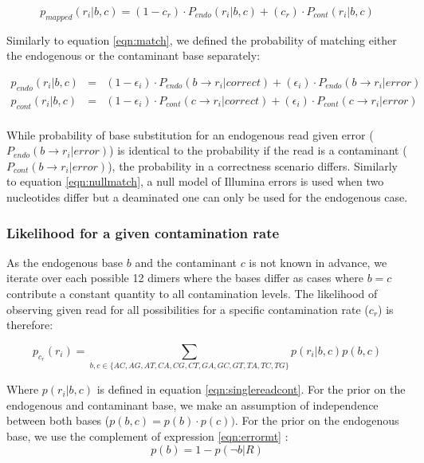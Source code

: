 \documentclass[a4paper,12pt]{article}
\begin{document}
\begin{equation}
p_{mapped}(r_i|b,c) = (1-c_r) \cdot P_{endo} (r_i|b,c)   + (c_r) \cdot P_{cont} (r_i|b,c)
\end{equation}

\noindent Similarly to equation \ref{eqn:match}, we defined the probability of matching either the endogenous or the contaminant base separately:


\begin{eqnarray}
  p_{endo}(r_i|b,c)   & = &  (1-\epsilon_i ) \cdot  P_{endo}( b \to r_i|correct) +  (\epsilon_i) \cdot P_{endo}(  b \to r_i |error)   \\
  p_{cont}(r_i|b,c)   & = &  (1-\epsilon_i ) \cdot  P_{cont}( c \to r_i|correct) +  (\epsilon_i) \cdot P_{cont}(  c \to r_i |error)   \\
\end{eqnarray} 

\noindent While probability of base substitution for an endogenous read given error ($P_{endo}(  b \to r_i |error)$) is identical to the probability if the read is a contaminant ($P_{cont}(  b \to r_i |error)$), the probability in a correctness scenario differs. Similarly to equation \ref{eqn:nullmatch}, a null model of Illumina errors is used when two nucleotides differ but a deaminated one can only be used for the endogenous case. 

\subsubsection{Likelihood for a given contamination rate}

As the endogenous base $b$ and the contaminant $c$ is not known in advance, we iterate over each possible 12 dimers where the bases differ as cases where $b=c$ contribute a constant quantity to all contamination levels. The likelihood of observing given read for all possibilities for a specific contamination rate ($c_r$) is therefore:

\begin{equation}
p_{c_r}(r_i) = \sum\limits_{ b,c \in \{AC,AG,AT,CA,CG,CT,GA,GC,GT,TA,TC,TG\} } p(r_i|b,c) p(b,c)
\end{equation}

\noindent Where $p(r_i|b,c)$ is defined in equation \ref{eqn:singlereadcont}. For the prior on the endogenous and contaminant base, we make an assumption of independence between both bases ($p(b,c) = p(b) \cdot p(c))$. For the prior on the endogenous base, we use the complement of expression \ref{eqn:errormt} :
\begin{equation}
p(b)  = 1 - p(\neg b|R)
\end{equation}
\end{document}
